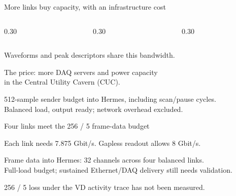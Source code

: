 \documentclass[aspectratio=169,11pt]{beamer}
\renewcommand{\DuneDiagramCaption}[1]{%
  {\color{DuneTextMuted}\footnotesize #1\par}%
}
\begin{document}
\begin{frame}{More links buy capacity, with an infrastructure cost}
  \begin{columns}[T,onlytextwidth]
    \begin{column}{0.30\textwidth}
    \end{column}
    \begin{column}{0.30\textwidth}
    \end{column}
    \begin{column}{0.30\textwidth}
    \end{column}
  \end{columns}
  \bigskip
  {\large Waveforms and peak descriptors share this bandwidth.\par}
  \medskip
  {\large The price: more DAQ servers and power capacity\\in the Central Utility Cavern (CUC).\par}
  \medskip
  {\small\color{DuneTextMuted}512-sample sender budget into Hermes, including scan/pause cycles.\\Balanced load, output ready; network overhead excluded.}
\end{frame}

\begin{frame}{Four links meet the 256 / 5 frame-data budget}
  \centering
  \par\bigskip
  {\large Each link needs 7.875 Gbit/s. Gapless readout allows 8 Gbit/s.\par}
  \medskip
  \DuneDiagramCaption{Frame data into Hermes: 32 channels across four balanced links.\\Full-load budget; sustained Ethernet/DAQ delivery still needs validation.}
  \medskip
  {\small\color{DuneCoral}256 / 5 loss under the VD activity trace has not been measured.}
\end{frame}
\end{document}
